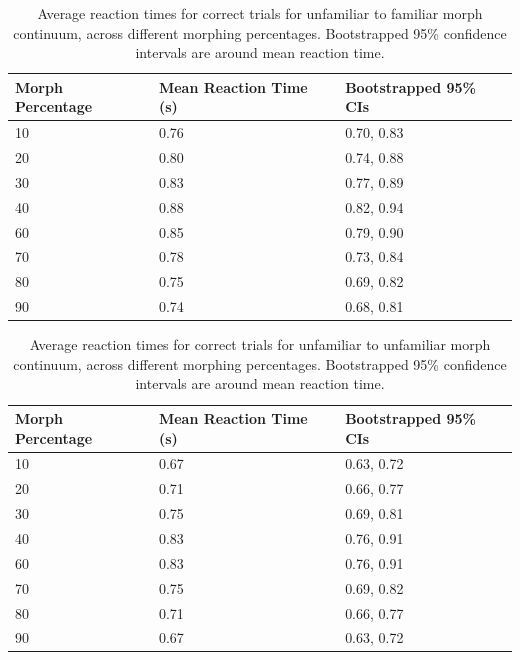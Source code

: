 \documentclass[10pt,letterpaper]{article}
\begin{document}
\setcounter{totalnumber}{3}%
\begin{table}[ht]
  \renewcommand{\thetable}{\arabic{table}a}
  \caption{\color{Gray} Average reaction times for correct trials for unfamiliar to familiar morph continuum, across different morphing percentages. Bootstrapped 95\% confidence intervals are around mean reaction time.}
  \label{Table 3a}
  \begin{center}
  \begin{tabular}{ | m{3.5cm} | m{5cm}| m{3.5cm} | } 
  \hline
  \textbf{Morph Percentage} & \textbf{Mean Reaction Time (s)} & \textbf{Bootstrapped 95\% CIs} \\ 
  \hline
  10 & 0.76 & 0.70, 0.83 \\ 
  \hline
  20 & 0.80 & 0.74, 0.88 \\
  \hline
  30 & 0.83 & 0.77, 0.89 \\
  \hline
  40 & 0.88 & 0.82, 0.94 \\
  \hline
  60 & 0.85 & 0.79, 0.90 \\
  \hline
  70 & 0.78 & 0.73, 0.84 \\
  \hline
  80 & 0.75 & 0.69, 0.82 \\
  \hline
  90 & 0.74 & 0.68, 0.81\\
  \hline
  \end{tabular}
  \end{center}
\end{table}
\begin{table}[ht]
  \addtocounter{table}{-1}
  \renewcommand{\thetable}{\arabic{table}b}
  \caption{\color{Gray} Average reaction times for correct trials for unfamiliar to unfamiliar morph continuum, across different morphing percentages. Bootstrapped 95\% confidence intervals are around mean reaction time.}
  \label{Table 3b}
  \begin{center}
  \begin{tabular}{ | m{3.5cm} | m{5cm}| m{3.5cm} | } 
  \hline
  \textbf{Morph Percentage} & \textbf{Mean Reaction Time (s)} & \textbf{Bootstrapped 95\% CIs} \\ 
  \hline
  10 & 0.67 & 0.63, 0.72\\ 
  \hline
  20 & 0.71 & 0.66, 0.77 \\
  \hline
  30 & 0.75 & 0.69, 0.81 \\
  \hline
  40 & 0.83 & 0.76, 0.91 \\
  \hline
  60 & 0.83 & 0.76, 0.91 \\
  \hline
  70 & 0.75 & 0.69, 0.82 \\
  \hline
  80 & 0.71 & 0.66, 0.77 \\
  \hline
  90 & 0.67 & 0.63, 0.72 \\
  \hline
  \end{tabular}
  \end{center}
\end{table}
\end{document}
